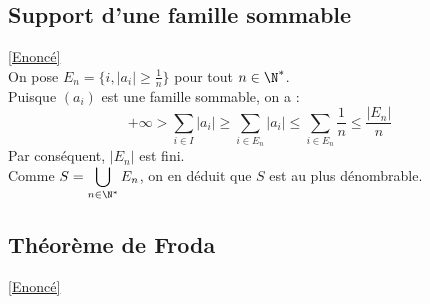 \documentclass[8pt]{book}
\begin{document}
	\subsection{Support d'une famille sommable }
	\textcolor{blue}{\hyperref[Support d'une famille sommable]{[Enoncé]}}\\
	\label{Support d'une famille sommable corrigé}
	On pose $E_n=\{i, |a_i|\geq \frac{1}{n}\}$ pour tout $n\in\N^*$.\\
	Puisque $(a_i)$ est une famille sommable, on a :
	\[+\infty> \sum_{i\in I}|a_i|\geq \sum_{i\in E_n} |a_i|\leq \sum_{i\in E_n}\frac{1}{n}\leq \frac{|E_n|}{n}\]
	Par conséquent, $|E_n|$ est fini.\\
	Comme $S=\displaystyle\bigcup_{n\in\N^*}E_n$, on en déduit que $S$ est au plus dénombrable.
	
	\subsection{Théorème de Froda }
	\textcolor{blue}{\hyperref[Théorème de Froda]{[Enoncé]}}\\
	\label{Théorème de Froda corrigé}
\end{document}
